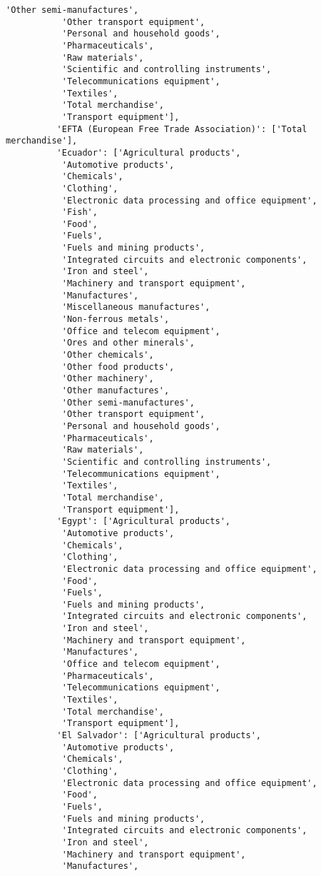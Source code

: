 \documentclass[11pt]{article}
\begin{document}
\begin{Verbatim}[commandchars=\\\{\}]
           'Other semi-manufactures',
           'Other transport equipment',
           'Personal and household goods',
           'Pharmaceuticals',
           'Raw materials',
           'Scientific and controlling instruments',
           'Telecommunications equipment',
           'Textiles',
           'Total merchandise',
           'Transport equipment'],
          'EFTA (European Free Trade Association)': ['Total merchandise'],
          'Ecuador': ['Agricultural products',
           'Automotive products',
           'Chemicals',
           'Clothing',
           'Electronic data processing and office equipment',
           'Fish',
           'Food',
           'Fuels',
           'Fuels and mining products',
           'Integrated circuits and electronic components',
           'Iron and steel',
           'Machinery and transport equipment',
           'Manufactures',
           'Miscellaneous manufactures',
           'Non-ferrous metals',
           'Office and telecom equipment',
           'Ores and other minerals',
           'Other chemicals',
           'Other food products',
           'Other machinery',
           'Other manufactures',
           'Other semi-manufactures',
           'Other transport equipment',
           'Personal and household goods',
           'Pharmaceuticals',
           'Raw materials',
           'Scientific and controlling instruments',
           'Telecommunications equipment',
           'Textiles',
           'Total merchandise',
           'Transport equipment'],
          'Egypt': ['Agricultural products',
           'Automotive products',
           'Chemicals',
           'Clothing',
           'Electronic data processing and office equipment',
           'Food',
           'Fuels',
           'Fuels and mining products',
           'Integrated circuits and electronic components',
           'Iron and steel',
           'Machinery and transport equipment',
           'Manufactures',
           'Office and telecom equipment',
           'Pharmaceuticals',
           'Telecommunications equipment',
           'Textiles',
           'Total merchandise',
           'Transport equipment'],
          'El Salvador': ['Agricultural products',
           'Automotive products',
           'Chemicals',
           'Clothing',
           'Electronic data processing and office equipment',
           'Food',
           'Fuels',
           'Fuels and mining products',
           'Integrated circuits and electronic components',
           'Iron and steel',
           'Machinery and transport equipment',
           'Manufactures',

\end{Verbatim}
\end{document}
